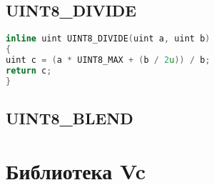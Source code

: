 \subsection{UINT8\_DIVIDE}
\begin{lstlisting}[language=c++]
inline uint UINT8_DIVIDE(uint a, uint b)
{
uint c = (a * UINT8_MAX + (b / 2u)) / b;
return c;
}
\end{lstlisting}

\subsection{UINT8\_BLEND}


\section{Библиотека Vc}






